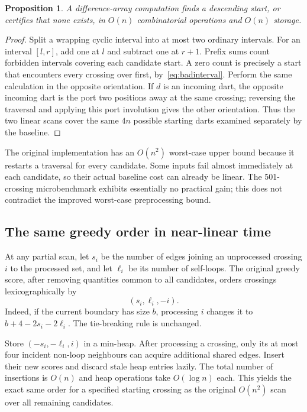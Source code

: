 \documentclass[11pt]{article}
\newtheorem{proposition}[theorem]{Proposition}
\theoremstyle{definition}\newtheorem{definition}[theorem]{Definition}
\theoremstyle{remark}\newtheorem{remark}[theorem]{Remark}
\begin{document}
\begin{proposition}
A difference-array computation finds a descending start, or certifies that none
exists, in $O(n)$ combinatorial operations and $O(n)$ storage.
\end{proposition}
\begin{proof}
Split a wrapping cyclic interval into at most two ordinary intervals. For an
interval $[l,r]$, add one at $l$ and subtract one at $r+1$. Prefix sums count
forbidden intervals covering each candidate start. A zero count is precisely
a start that encounters every crossing over first, by~\eqref{eq:badinterval}.
Perform the same calculation in the opposite orientation. If $d$ is an
incoming dart, the opposite incoming dart is the port two positions away at
the same crossing; reversing the traversal and applying this port involution
gives the other orientation. Thus the two linear scans cover the same $4n$
possible starting darts examined separately by the baseline.
\end{proof}
The original implementation has an $O(n^2)$ worst-case upper bound because it
restarts a traversal for every candidate. Some inputs fail almost immediately
at each candidate, so their actual baseline cost can already be linear. The
501-crossing microbenchmark exhibits essentially no practical gain; this does
not contradict the improved worst-case preprocessing bound.

\subsection{The same greedy order in near-linear time}
At any partial scan, let $s_i$ be the number of edges joining an unprocessed
crossing $i$ to the processed set, and let $\ell_i$ be its number of self-loops.
The original greedy score, after removing quantities common to all candidates,
orders crossings lexicographically by
\[
 (s_i,\ell_i,-i).
\]
Indeed, if the current boundary has size $b$, processing $i$ changes it to
$b+4-2s_i-2\ell_i$. The tie-breaking rule is unchanged.

Store $(-s_i,-\ell_i,i)$ in a min-heap. After processing a crossing, only its
at most four incident non-loop neighbours can acquire additional shared edges.
Insert their new scores and discard stale heap entries lazily. The total number
of insertions is $O(n)$ and heap operations take $O(\log n)$ each. This yields
the exact same order for a specified starting crossing as the original
$O(n^2)$ scan over all remaining candidates.
\end{document}
